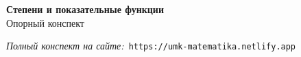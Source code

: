 \documentclass{umk-matematika}
\begin{document}
\begin{center}
{\Large\bfseries Степени и показательные функции}
\\[0.3cm]{\large Опорный конспект}
\end{center}
\vspace{0.5cm}

\begin{center}
\textit{Полный конспект на сайте:}\
\texttt{https://umk-matematika.netlify.app}
\end{center}
\end{document}
